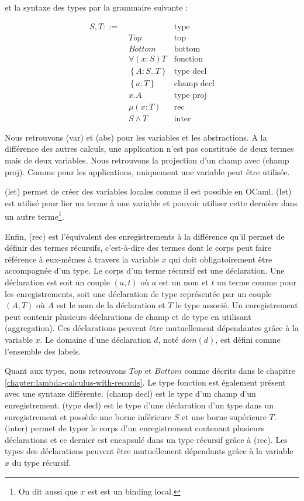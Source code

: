 et la syntaxe des types par la grammaire suivante :

\begin{align*}
  S, T ::= & \, & \text{type} \\
           & \; Top & \text{top} \\
           & \; Bottom & \text{bottom} \\
           & \; \forall(x : S) T & \text{fonction} \\
           & \; \left\{ A : S .. T \right\} & \text{type decl} \\
           & \; \left\{ a : T \right\} & \text{champ decl} \\
           & \; x.A & \text{type proj} \\
           & \; \mu(x : T) & \text{rec} \\
           & \; S \wedge T & \text{inter}
\end{align*}

Nous retrouvons (var) et (abs) pour les variables et les
abstractions.
A la différence des autres calculs, une application n'est pas constituée de deux
termes mais de deux variables. Nous retrouvons la projection d'un champ avec
(champ proj). Comme pour les applications, uniquement une variable peut être
utilisée.

(let) permet de créer des variables locales comme il est possible en OCaml.
(let) est utilisé pour lier un terme à une variable et pouvoir utiliser cette
dernière dans un autre terme\footnote{On dit aussi que $x$ est est un binding local.}.

Enfin, (rec) est l'équivalent des enregistrements à la différence qu'il permet
de définir des termes récursifs, c'est-à-dire des termes
dont le corps peut faire référence à eux-mêmes à travers la variable $x$ qui
doit obligatoirement être accompagnée d'un type. Le
corps d'un terme récursif est une déclaration. Une déclaration est soit un
couple $(a, t)$ où $a$ est un nom et $t$ un terme comme pour les
enregistrements, soit une déclaration de type représentée par un couple $(A,
T)$ où $A$ est le nom de la déclaration et $T$ le type associé. Un enregistrement peut contenir plusieurs déclarations de champ et
de type en utilisant (aggregation). Ces déclarations peuvent être mutuellement
dépendantes grâce à la variable $x$.
Le domaine d'une déclaration $d$, noté $dom(d)$, est défini comme l'ensemble des
labels.

Quant aux types, nous retrouvons $Top$ et $Bottom$ comme décrits dans le
chapitre \ref{chapter:lambda-calculus-with-records}. Le type fonction est
également présent avec une syntaxe différente. (champ decl) est le type d'un
champ d'un enregistrement. (type decl) est le type d'une déclaration d'un type
dans un enregistrement et possède une borne inférieure $S$ et une borne
supérieure $T$. (inter) permet de typer le corps d'un enregistrement contenant
plusieurs déclarations et ce dernier est encapsulé dans un type récursif grâce à (rec). Les
types des déclarations peuvent être mutuellement dépendants grâce à la variable
$x$ du type récursif.

